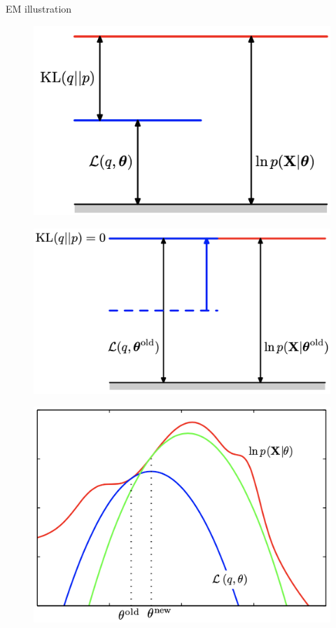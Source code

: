 \begin{frame}{EM illustration}
	
	\begin{minipage}[t]{0.45\columnwidth}
		\begin{figure}
			\includegraphics[width=0.9\linewidth]{figs/em_bishop1}
		\end{figure}
	\end{minipage}%
	\begin{minipage}[t]{0.55\columnwidth}
		\begin{figure}
			\includegraphics[width=0.85\linewidth]{figs/em_bishop2}
		\end{figure}
	\end{minipage}
	\begin{figure}
		\includegraphics[width=.55\linewidth]{figs/em_bishop3}
	\end{figure}

\end{frame}
